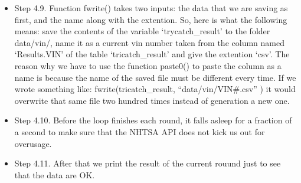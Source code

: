 \documentclass[]{book}
\newenvironment{Shaded}{\begin{snugshade}}{\end{snugshade}}
\newcommand{\CharTok}[1]{\textcolor[rgb]{0.31,0.60,0.02}{#1}}
\newcommand{\CommentTok}[1]{\textcolor[rgb]{0.56,0.35,0.01}{\textit{#1}}}
\newcommand{\ControlFlowTok}[1]{\textcolor[rgb]{0.13,0.29,0.53}{\textbf{#1}}}
\newcommand{\DataTypeTok}[1]{\textcolor[rgb]{0.13,0.29,0.53}{#1}}
\newcommand{\DecValTok}[1]{\textcolor[rgb]{0.00,0.00,0.81}{#1}}
\newcommand{\KeywordTok}[1]{\textcolor[rgb]{0.13,0.29,0.53}{\textbf{#1}}}
\newcommand{\NormalTok}[1]{#1}
\newcommand{\OperatorTok}[1]{\textcolor[rgb]{0.81,0.36,0.00}{\textbf{#1}}}
\newcommand{\StringTok}[1]{\textcolor[rgb]{0.31,0.60,0.02}{#1}}
\begin{document}
\begin{itemize}
\item
  Step 4.9. Function fwrite() takes two inputs: the data that we are saving as first, and the name along with the extention. So, here is what the following means: save the contents of the variable `trycatch\_result' to the folder data/vin/, name it as a current vin number taken from the column named `Results.VIN' of the table `tricatch\_result' and give the extention `csv'. The reason why we have to use the function paste0() to paste the column as a name is because the name of the saved file must be different every time. If we wrote something like: fwrite(tricatch\_result, ``data/vin/VIN\#.csv'' ) it would overwrite that same file two hundred times instead of generation a new one.
\item
  Step 4.10. Before the loop finishes each round, it falls asleep for a fraction of a second to make sure that the NHTSA API does not kick us out for overusage.
\item
  Step 4.11. After that we print the result of the current rouund just to see that the data are OK.
\end{itemize}

\begin{Shaded}
\end{Shaded}
\end{document}
